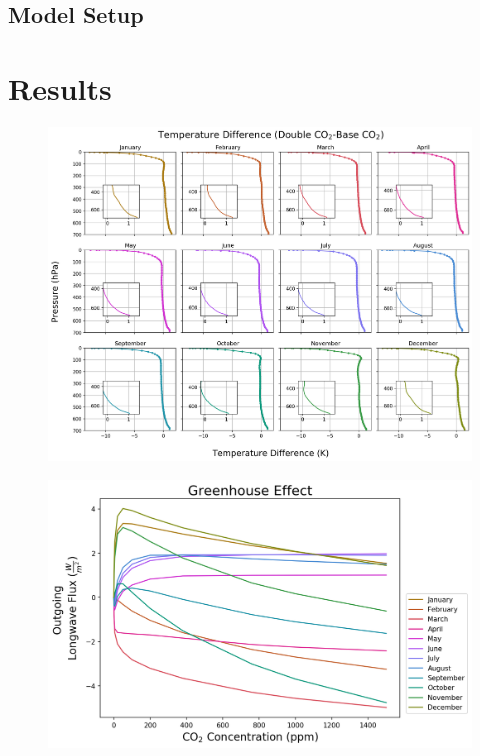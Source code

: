 \documentclass[12]{article}
\begin{document}
\subsection{Model Setup}
\section{Results}
\begin{figure}[htb!]
\noindent\includegraphics[width=1\textwidth]{figures/temp_dif.png}
\centering
\caption{}
\label{fig:temp_dif}
\end{figure}

\begin{figure}[htb!]
\noindent\includegraphics[width=1\textwidth]{figures/GHE.png}
\centering
\caption{}
\label{fig:GHE}
\end{figure}
\end{document}
